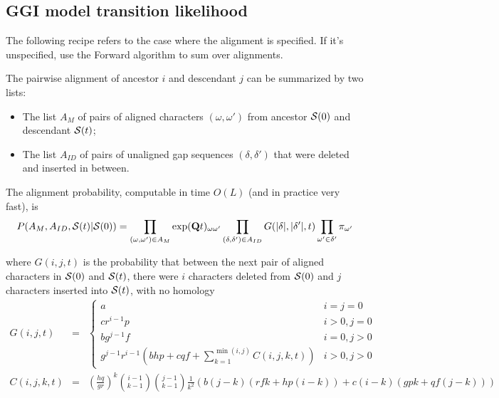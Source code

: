 \documentclass{article}
\begin{document}
\subsection{GGI model transition likelihood}

The following recipe refers to the case where the alignment is specified.
If it's unspecified, use the Forward algorithm to sum over alignments.

The pairwise alignment of ancestor $i$ and descendant $j$ can be summarized by two lists:
\begin{itemize}
    \item The list $A_M$ of pairs of aligned characters $(\omega,\omega')$ from ancestor ${\cal S}(0)$ and descendant ${\cal S}(t)$;
    \item The list $A_{ID}$ of pairs of unaligned gap sequences $(\delta,\delta')$ that were deleted and inserted in between.
\end{itemize}

The alignment probability, computable in time $O(L)$ (and in practice very fast), is
\[
P(A_M,A_{ID},{\cal S}(t)|{\cal S}(0)) =
\prod_{(\omega,\omega') \in A_M} \exp({\bf Q}t)_{\omega \omega'}
\prod_{(\delta,\delta') \in A_{ID}} G(|\delta|,|\delta'|,t)
\prod_{\omega'\in \delta'} \pi_{\omega'}
\]

where $G(i,j,t)$ is the probability that between the next pair of aligned characters in ${\cal S}(0)$ and ${\cal S}(t)$,
there were $i$ characters deleted from ${\cal S}(0)$ 
and $j$ characters inserted into ${\cal S}(t)$,
with no homology
\begin{eqnarray*}
G(i,j,t) & = &
\left\{ \begin{array}{ll}
a & i=j=0 \\
cr^{i-1}p & i>0, j=0 \\
bg^{j-1}f & i=0, j>0 \\
\displaystyle
g^{j-1} r^{i-1}
\left(
bhp + cqf +
\sum_{k=1}^{\min(i,j)} C(i,j,k,t)
\right)
& i>0, j>0
\end{array} \right.
\\
C(i,j,k,t) & = &
\left( \frac{hq}{gr} \right)^k
\binom{i-1}{k-1} \binom{j-1}{k-1} \frac{1}{k^2}
\left( b(j-k)(rfk + hp(i-k)) + c(i-k)(gpk + qf(j-k)) \right)
\end{eqnarray*}

\end{document}
